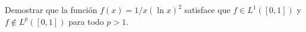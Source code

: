 \documentclass{book}
\newcommand{\rr}{\mathbb{R}}
\begin{document}


 \begin{ejer}{}
  Demostrar que la función $f(x)=1 /x(\ln x)^2 $ satisface que $f\in L^1([0,1])$ y $f\notin L^p([0,1])$ para todo $p>1$.
  \end{ejer}


\end{document}
